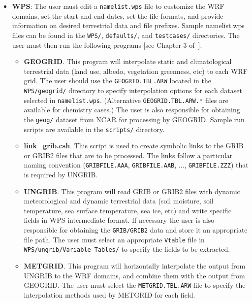 \begin{itemize}
\item \textbf{WPS}: The user must edit a \texttt{namelist.wps} file to 
customize the WRF domains, set the start and end dates, set the file formats, 
and provide information on desired terrestrial data and file prefixes.  Sample 
namelist.wps files can be found in the \texttt{WPS/}, \texttt{defaults/}, 
and \texttt{testcases/} directories. The user must then run the following 
programs [see Chapter 3 of~\cite{ref:ArwUserGuide}].

  \begin{itemize}
  \item \textbf{GEOGRID}. This program will interpolate static and 
    climatological terrestrial data (land use, albedo, vegetation greenness,
    etc) to each WRF grid. The user should use the \texttt{GEOGRID.TBL.ARW}
    located in the \texttt{WPS/geogrid/} directory to specify interpolation 
    options for each dataset selected in \texttt{namelist.wps}. (Alternative
    \texttt{GEOGRID.TBL.ARW.*} files are available for chemistry cases.)  The 
    user is also responsible for obtaining the \texttt{geog/} dataset from NCAR
    for processing by GEOGRID. Sample run scripts are available in the 
    \texttt{scripts/} directory. 
  \item \textbf{link\_grib.csh}. This script is used to create symbolic links
    to the GRIB or GRIB2 files that are to be processed. The links follow a 
    particular naming convention (\texttt{GRIBFILE.AAA}, 
    \texttt{GRIBFILE.AAB}, ..., \texttt{GRIBFILE.ZZZ}) that is required by 
    UNGRIB.
  \item \textbf{UNGRIB}. This program will read GRIB or GRIB2 files with 
    dynamic meteorological and dynamic terrestrial data (soil moisture, soil 
    temperature, sea surface temperature, sea ice, etc) and write specific 
    fields in WPS intermediate format. If necessary the user is also responsible 
    for obtaining the \texttt{GRIB/GRIB2} data and store it an appropriate file path.
    The user must select an appropriate 
    \texttt{Vtable} file in \texttt{WPS/ungrib/Variable\_Tables/} to specify 
    the fields to be extracted.
  \item \textbf{METGRID}. This program will horizontally interpolate the 
    output from UNGRIB to the WRF domains, and combine them with the output
    from GEOGRID. The user must select the \texttt{METGRID.TBL.ARW} file to
    specify the interpolation methods used by METGRID for each field. 
  \end{itemize}

\end{itemize}
